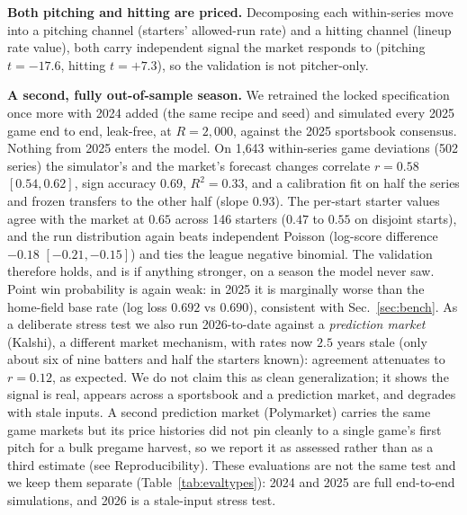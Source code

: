 \documentclass[10pt,twocolumn]{article}
\begin{document}
\textbf{Both pitching and hitting are priced.} Decomposing each within-series move into a pitching
channel (starters' allowed-run rate) and a hitting channel (lineup rate value), both carry independent
signal the market responds to (pitching $t{=}{-}17.6$, hitting $t{=}{+}7.3$), so the validation is not
pitcher-only.

\textbf{A second, fully out-of-sample season.} We retrained the locked specification once more with
2024 added (the same recipe and seed) and simulated every 2025 game end to end, leak-free, at
$R{=}2{,}000$, against the 2025 sportsbook consensus. Nothing from 2025 enters the model. On 1{,}643
within-series game deviations (502 series) the simulator's and the market's forecast changes correlate
$r{=}0.58$ $[0.54,0.62]$, sign accuracy $0.69$, $R^2{=}0.33$, and a calibration fit on half the series
and frozen transfers to the other half (slope $0.93$). The per-start starter values agree with the
market at $0.65$ across 146 starters ($0.47$ to $0.55$ on disjoint starts), and the run distribution
again beats independent Poisson (log-score difference $-0.18$ $[-0.21,-0.15]$) and ties the league
negative binomial. The validation therefore holds, and is if anything stronger, on a season the model
never saw. Point win probability is again weak: in 2025 it is marginally worse than the home-field
base rate (log loss $0.692$ vs $0.690$), consistent with Sec.~\ref{sec:bench}. As a
deliberate stress test we also run 2026-to-date against a \emph{prediction market} (Kalshi), a
different market mechanism, with rates now $2.5$ years stale (only about six of nine batters and half
the starters known): agreement attenuates to $r{=}0.12$, as expected. We do not claim this as clean
generalization; it shows the signal is real, appears across a sportsbook and a prediction market, and
degrades with stale inputs. A second prediction market (Polymarket) carries the same game markets but
its price histories did not pin cleanly to a single game's first pitch for a bulk pregame harvest, so
we report it as assessed rather than as a third estimate (see Reproducibility). These evaluations are
not the same test and we keep them separate (Table~\ref{tab:evaltypes}): 2024 and 2025 are full
end-to-end simulations, and 2026 is a stale-input stress test.
\end{document}
